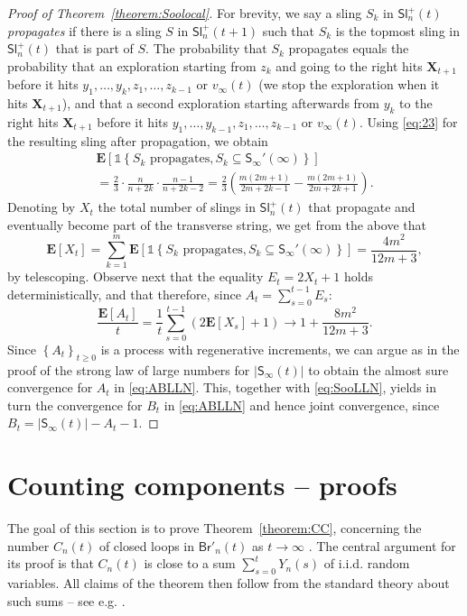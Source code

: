 \documentclass[a4paper,11pt,reqno]{amsart}
\newcommand{\bE}{\mathbf{E}}
\newcommand{\Br}{\mathsf{Br}}
\newcommand{\Slr}{\mathsf{Sl}^+}
\newcommand{\Soo}{\mathsf{S}_\infty}
\newcommand{\ssq}{\subseteq}
\theoremstyle{definition}
\begin{document}
\begin{proof}[Proof of Theorem~\ref{theorem:Soolocal}]
 For brevity, we say a sling $S_k$ in $\Slr_n(t)$ \emph{propagates} if there is a sling $S$ in $\Slr_n(t+1)$ such that $S_k$ is the topmost sling in $\Slr_n(t)$ that is part of $S$. The probability that $S_k$ propagates equals the probability that an exploration starting from $z_k$ and going to the right hits $\mathbf{X}_{t+1}$ before it hits $y_1,\dots,y_k,z_1,\dots,z_{k-1}$ or $v_\infty(t)$ (we stop the exploration when it hits $\mathbf{X}_{t+1}$), and that a second exploration starting afterwards from $y_k$ to the right hits $\mathbf{X}_{t+1}$ before it hits $y_1,\dots,y_{k-1},z_1,\dots,z_{k-1}$ or $v_\infty(t)$. Using \eqref{eq:23} for the resulting sling after propagation, we obtain
 \begin{multline*}
  \bE\left[\mathds{1}\left\{S_k\text{ propagates}, S_k\ssq \Soo'(\infty)\right\}\right]\\ =\frac{2}{3}\cdot\frac{n}{n+2k}\cdot \frac{n-1}{n+2k-2}
  = \frac{2}{3}\left(\frac{m(2m+1)}{2m+2k-1} - \frac{m(2m+1)}{2m+2k+1}\right).
 \end{multline*}
 Denoting by $X_t$ the total number of slings in $\Slr_n(t)$ that propagate and eventually become part of the transverse string, we get from the above that 
 \[
  \bE[X_t] = \sum_{k=1}^m \bE\left[\mathds{1}\left\{S_k\text{ propagates}, S_k\ssq \Soo'(\infty)\right\}\right] = \frac{4m^2}{12m+3},
 \]
 by telescoping. Observe next that the equality $E_t=2X_t+1$ holds deterministically, and that therefore, since $A_t = \sum_{s=0}^{t-1} E_s$:
 \[
  \frac{\bE[A_t]}{t} = \frac{1}{t} \sum_{s=0}^{t-1} (2\bE[X_s]+1) \to 1+\frac{8m^2}{12m+3}.
 \]
 Since $\left\{A_t\right\}_{t\geq 0}$ is a process with regenerative increments, we can argue as in the proof of the strong law of large numbers for $|\Soo(t)|$ to obtain the almost sure convergence for $A_t$ in \eqref{eq:ABLLN}. This, together with \eqref{eq:SooLLN}, yields in turn the convergence for $B_t$ in \eqref{eq:ABLLN} and hence joint convergence, since $B_t=|\Soo(t)|-A_t-1$. 
\end{proof}

 
\section{Counting components -- proofs}
\label{sec:proofsI}

The goal of this section is to prove Theorem~\ref{theorem:CC}, concerning the number $C_n(t)$ of closed loops in $\Br'_n(t)$ as $t \rightarrow \infty$ . The central argument for its proof is that $C_n(t)$ is close to a sum $\sum_{s=0}^t Y_n(s)$ of i.i.d. random variables. All claims of the theorem then follow from the standard theory about such sums -- see e.g. \cite[Theorems $6.6.1$, $6.10.2$, $7.1.1$ and $7.5.1$]{Gut13}. 
\end{document}
